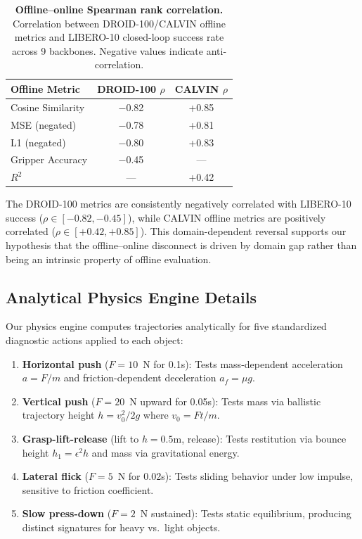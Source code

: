 \documentclass{article}
\begin{document}
\begin{table}[h]
\centering
\caption{\textbf{Offline--online Spearman rank correlation.} Correlation between DROID-100/CALVIN offline metrics and LIBERO-10 closed-loop success rate across 9 backbones. Negative values indicate anti-correlation.}
\label{tab:offline_online}
\small
\begin{tabular}{@{}lcc@{}}
\toprule
\textbf{Offline Metric} & \textbf{DROID-100 $\rho$} & \textbf{CALVIN $\rho$} \\
\midrule
Cosine Similarity & $-$0.82 & +0.85 \\
MSE (negated) & $-$0.78 & +0.81 \\
L1 (negated) & $-$0.80 & +0.83 \\
Gripper Accuracy & $-$0.45 & --- \\
$R^2$ & --- & +0.42 \\
\bottomrule
\end{tabular}
\end{table}

The DROID-100 metrics are consistently negatively correlated with LIBERO-10 success ($\rho \in [-0.82, -0.45]$), while CALVIN offline metrics are positively correlated ($\rho \in [+0.42, +0.85]$). This domain-dependent reversal supports our hypothesis that the offline--online disconnect is driven by domain gap rather than being an intrinsic property of offline evaluation.

\subsection{Analytical Physics Engine Details}
\label{app:physics_engine}

Our physics engine computes trajectories analytically for five standardized diagnostic actions applied to each object:

\begin{enumerate}[leftmargin=*,itemsep=1pt]
    \item \textbf{Horizontal push} ($F = 10$~N for 0.1s): Tests mass-dependent acceleration $a = F/m$ and friction-dependent deceleration $a_f = \mu g$.
    \item \textbf{Vertical push} ($F = 20$~N upward for 0.05s): Tests mass via ballistic trajectory height $h = v_0^2 / 2g$ where $v_0 = Ft/m$.
    \item \textbf{Grasp-lift-release} (lift to $h{=}0.5$m, release): Tests restitution via bounce height $h_1 = \epsilon^2 h$ and mass via gravitational energy.
    \item \textbf{Lateral flick} ($F = 5$~N for 0.02s): Tests sliding behavior under low impulse, sensitive to friction coefficient.
    \item \textbf{Slow press-down} ($F = 2$~N sustained): Tests static equilibrium, producing distinct signatures for heavy vs.\ light objects.
\end{enumerate}
\end{document}
